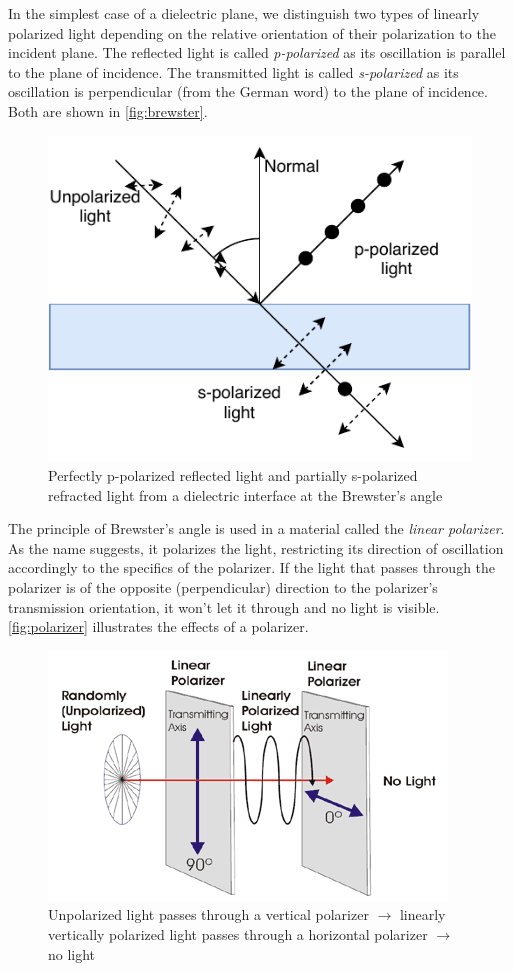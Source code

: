 In the simplest case of a dielectric plane, we distinguish two types of linearly polarized light depending on the relative orientation of their polarization to the incident plane. The reflected light is called \emph{p-polarized} as its oscillation is parallel to the plane of incidence. The transmitted light is called \emph{s-polarized} as its oscillation is perpendicular (from the German word) to the plane of incidence. Both are shown in \autoref{fig:brewster}.

\begin{figure}[h]
	\centering
	\includegraphics[width=.7\linewidth]{img/brewster.pdf}
	\caption{Perfectly p-polarized reflected light and partially s-polarized refracted light from a dielectric interface at the Brewster's angle}
	\label{fig:brewster}
\end{figure}


The principle of Brewster's angle is used in a material called the \emph{linear polarizer}. As the name suggests, it polarizes the light, restricting its direction of oscillation accordingly to the specifics of the polarizer. If the light that passes through the polarizer is of the opposite (perpendicular) direction to the polarizer's transmission orientation, it won't let it through and no light is visible. \autoref{fig:polarizer} illustrates the effects of a polarizer.

\begin{figure}[h]
	\centering
	\includegraphics[width=.6\linewidth]{img/polarizer.png}
	\caption[nikon]{Unpolarized light passes through a vertical polarizer $\rightarrow$ linearly vertically polarized light passes through a horizontal polarizer $\rightarrow$ no light\footnotemark}
	\label{fig:polarizer}
\end{figure}

